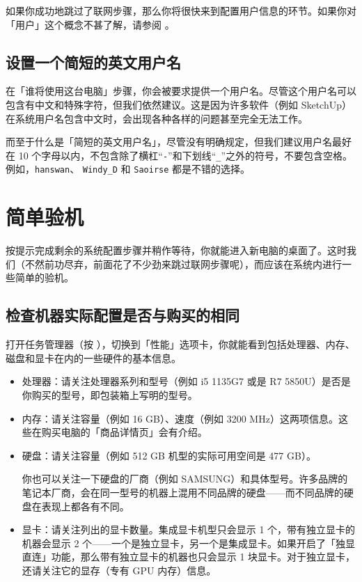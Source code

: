 如果你成功地跳过了联网步骤，那么你将很快来到配置用户信息的环节。如果你对「用户」这个概念不甚了解，请参阅 。

\subsection{设置一个简短的英文用户名}

在「谁将使用这台电脑」步骤，你会被要求提供一个用户名。尽管这个用户名可以包含有中文和特殊字符，但我们依然建议。这是因为许多软件（例如 SketchUp）在系统用户名包含中文时，会出现各种各样的问题甚至完全无法工作。

而至于什么是「简短的英文用户名」，尽管没有明确规定，但我们建议用户名最好在 10 个字母以内，不包含除了横杠“\verb|-|”和下划线“\verb|_|”之外的符号，不要包含空格。例如，\verb|hanswan|、 \verb|Windy_D| 和 \verb|Saoirse| 都是不错的选择。

\section{简单验机}

按提示完成剩余的系统配置步骤并稍作等待，你就能进入新电脑的桌面了。这时我们（不然前功尽弃，前面花了不少劲来跳过联网步骤呢），而应该在系统内进行一些简单的验机。

\subsection{检查机器实际配置是否与购买的相同}

打开任务管理器（按 ），切换到「性能」选项卡，你就能看到包括处理器、内存、磁盘和显卡在内的一些硬件的基本信息。

\begin{itemize}
  \item 处理器：请关注处理器系列和型号（例如 i5 1135G7 或是 R7 5850U）是否是你购买的型号，即包装箱上写明的型号。
  \item 内存：请关注容量（例如 16 GB）、速度（例如 3200 MHz）这两项信息。这些在购买电脑的「商品详情页」会有介绍。
  \item 硬盘：请关注容量（例如 512 GB 机型的实际可用空间是 477 GB）。
    \begin{note}
      你也可以关注一下硬盘的厂商（例如 SAMSUNG）和具体型号。许多品牌的笔记本厂商，会在同一型号的机器上混用不同品牌的硬盘——而不同品牌的硬盘在表现上都各有不同。
    \end{note}
  \item 显卡：请关注列出的显卡数量。集成显卡机型只会显示 1 个，带有独立显卡的机器会显示 2 个——一个是独立显卡，另一个是集成显卡。如果开启了「独显直连」功能，那么带有独立显卡的机器也只会显示 1 块显卡。对于独立显卡，还请关注它的显存（专有 GPU 内存）信息。
\end{itemize}

